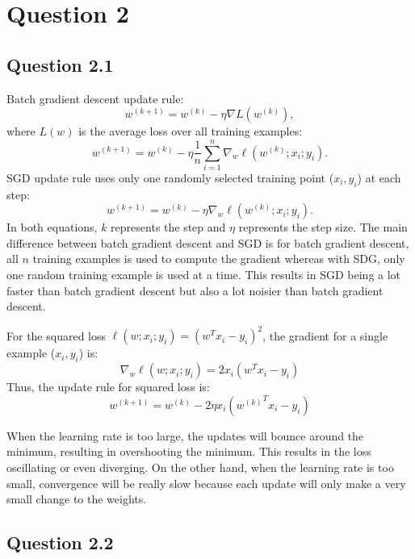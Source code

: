 \section{Question 2}

\subsection{Question 2.1}

 Batch gradient descent update rule:
\[w^{(k+1)} = w^{(k)} - \eta \nabla L(w^{(k)}),\]
where $L(w)$ is the average loss over all training examples:
\[w^{(k+1)} = w^{(k)} - \eta \frac{1}{n} \sum_{i=1}^{n} \nabla_{w} \ell(w^{(k)}; x_i; y_i).\]
SGD update rule uses only one randomly selected training point ($x_i,y_i$) at each step:
\[w^{(k+1)} = w^{(k)} - \eta \nabla_w \ell(w^{(k)};x_i;y_i).\]
In both equations, $k$ represents the step and $\eta$ represents the step size.
The main difference between batch gradient descent and SGD is for batch gradient descent,
all $n$ training examples is used to compute the gradient whereas with SDG, only one random 
training example is used at a time. This results in SGD being a lot faster than batch gradient
descent but also a lot noisier than batch gradient descent.

 For the squared loss $\ell(w;x_i;y_i) = (w^{T}x_i - y_i)^2$, the gradient for a single example ($x_i,y_i$) is:
\[\nabla_w\ell(w;x_i;y_i) = 2x_i(w^{T}x_i - y_i)\]
Thus, the update rule for squared loss is:
\[w^{(k+1)} = w^{(k)} - 2\eta x_i({w^{(k)}}^{T}x_i - y_i)\]

 When the learning rate is too large, the updates will bounce around the minimum, 
resulting in overshooting the minimum. This results in the loss oscillating or even 
diverging. On the other hand, when the learning rate is too small, convergence will be 
really slow because each update will only make a very small change to the weights.

\subsection{Question 2.2}

